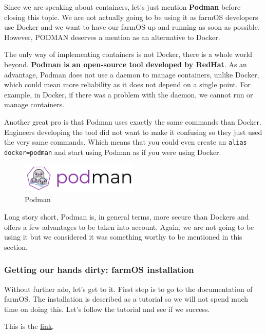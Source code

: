 \vspace{7mm}
Since we are speaking about containers, let's just mention \textbf{Podman}\cite{podman} before closing this topic. We are not actually going to be using it as farmOS developers use Docker and we want to have our farmOS up and running as soon as possible. However, PODMAN deserves a mention as an alternative to Docker.

\vspace{7mm}
The only way of implementing containers is not Docker, there is a whole world beyond. \textbf{Podman is an open-source tool developed by RedHat}. As an advantage, Podman does not use a daemon to manage containers, unlike Docker, which could mean more reliability as it does not depend on a single point. For example, in Docker, if there was a problem with the daemon, we cannot run or manage containers.

Another great pro is that Podman uses exactly the same commands than Docker. Engineers developing the tool did not want to make it confusing so they just used the very same commands. Which means that you could even create an \verb|alias docker=podman| and start using Podman as if you were using Docker.

\begin{figure}[H]
    \centering
    \includegraphics[width=0.5\textwidth]{fig/podman_logo.png}
        \caption{Podman}
    \label{fig:podman-logo}
\end{figure}


Long story short, Podman is, in general terms, more secure than Dockers and offers a few advantages to be taken into account. Again, we are not going to be using it but we considered it was something worthy to be mentioned in this section.

\vspace{7mm}
\subsubsection{Getting our hands dirty: farmOS installation}
Without further ado, let's get to it. First step is to go to the documentation of farmOS. The installation is described as a tutorial so we will not spend much time on doing this. Let's follow the tutorial and see if we success. 

This is the \href{https://farmos.org/hosting/docker/}{link}.

